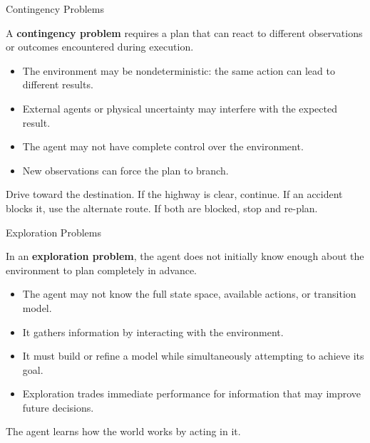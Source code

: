 \documentclass[aspectratio=169,10pt]{beamer}
\begin{document}
\begin{frame}{Contingency Problems}
  \begin{cpdefinition}
    A \textbf{contingency problem} requires a plan that can react to different observations or outcomes encountered during execution.
  \end{cpdefinition}
  \vspace{0.08in}
  \begin{itemize}
    \item The environment may be nondeterministic: the same action can lead to different results.
    \item External agents or physical uncertainty may interfere with the expected result.
    \item The agent may not have complete control over the environment.
    \item New observations can force the plan to branch.
  \end{itemize}
  \vspace{0.08in}
  \begin{exampleblockcp}
    Drive toward the destination. If the highway is clear, continue. If an accident blocks it, use the alternate route. If both are blocked, stop and re-plan.
  \end{exampleblockcp}
\end{frame}

\begin{frame}{Exploration Problems}
  \begin{cpdefinition}
    In an \textbf{exploration problem}, the agent does not initially know enough about the environment to plan completely in advance.
  \end{cpdefinition}
  \vspace{0.08in}
  \begin{itemize}
    \item The agent may not know the full state space, available actions, or transition model.
    \item It gathers information by interacting with the environment.
    \item It must build or refine a model while simultaneously attempting to achieve its goal.
    \item Exploration trades immediate performance for information that may improve future decisions.
  \end{itemize}
  \vspace{0.08in}
  \begin{keyidea}
    The agent learns how the world works by acting in it.
  \end{keyidea}
\end{frame}
\end{document}
